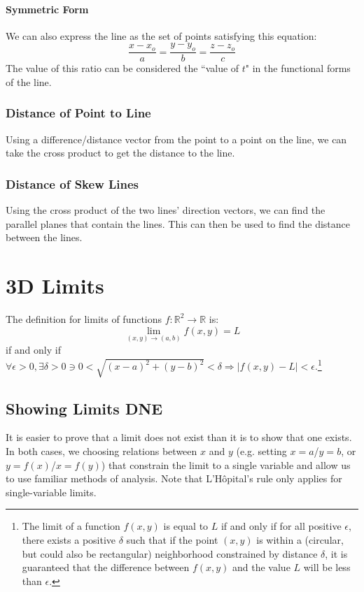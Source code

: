 \documentclass{article}
\newcommand{\abs}[1]{\left|#1\right|}
\begin{document}
\paragraph{Symmetric Form}
We can also express the line as the set of points satisfying this equation:
$$
\frac{x-x_o}{a} = \frac{y-y_o}{b} = \frac{z-z_o}{c}
$$
The value of this ratio can be considered the ``value of $t$" in the functional forms of the line.

\subsubsection{Distance of Point to Line}
Using a difference/distance vector from the point to a point on the line, we can take the cross product to get the distance to the line.

\subsubsection{Distance of Skew Lines}
Using the cross product of the two lines' direction vectors, we can find the parallel planes that contain the lines. This can then be used to find the distance between the lines.

\section{3D Limits}
The definition for limits of functions $f: \mathbb{R}^2 \to \mathbb{R}$ is:
\[
    \lim_{(x,y)\to(a,b)}f(x,y) = L
\] if and only if $\forall\epsilon>0, \exists\delta>0 \ni 0<\sqrt{(x-a)^2+(y-b)^2}<\delta \Rightarrow \abs{f(x,y) - L}<\epsilon$.\footnote{The limit of a function $f(x,y)$ is equal to $L$ if and only if for all positive $\epsilon$, there exists a positive $\delta$ such that if the point $(x,y)$ is within a (circular, but could also be rectangular) neighborhood constrained by distance $\delta$, it is guaranteed that the difference between $f(x,y)$ and the value $L$ will be less than $\epsilon$.}

\subsection{Showing Limits DNE}
It is easier to prove that a limit does not exist than it is to show that one exists. In both cases, we choosing relations between $x$ and $y$ (e.g. setting $x=a$/$y=b$, or $y=f(x)$/$x=f(y)$) that constrain the limit to a single variable and allow us to use familiar methods of analysis. Note that L'Hôpital's rule only applies for single-variable limits.
\end{document}
